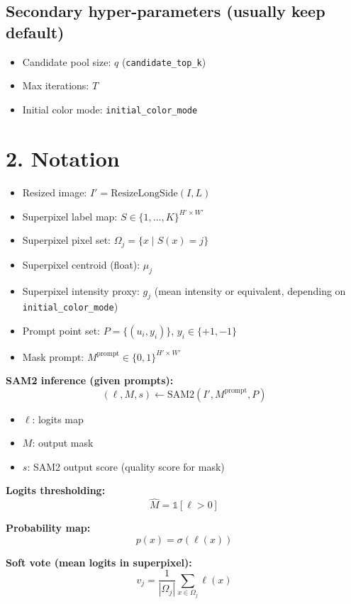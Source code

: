 \documentclass[11pt]{article}
\begin{document}
\subsection*{Secondary hyper-parameters (usually keep default)}
\begin{itemize}[leftmargin=1.25em]
  \item Candidate pool size: $q$ (\texttt{candidate\_top\_k})
  \item Max iterations: $T$
  \item Initial color mode: \texttt{initial\_color\_mode}
\end{itemize}

\section*{2. Notation}
\begin{itemize}[leftmargin=1.25em]
  \item Resized image: $I' = \mathrm{ResizeLongSide}(I, L)$
  \item Superpixel label map: $S \in \{1,\dots,K\}^{H'\times W'}$
  \item Superpixel pixel set: $\Omega_j = \{x \mid S(x)=j\}$
  \item Superpixel centroid (float): $\mu_j$
  \item Superpixel intensity proxy: $g_j$ (mean intensity or equivalent, depending on \texttt{initial\_color\_mode})
  \item Prompt point set: $P = \{(u_i, y_i)\}$, $y_i \in \{+1,-1\}$
  \item Mask prompt: $M^{\text{prompt}} \in \{0,1\}^{H'\times W'}$
\end{itemize}

\textbf{SAM2 inference (given prompts):}
\[ (\ell, M, s) \leftarrow \mathrm{SAM2}(I', M^{\text{prompt}}, P) \]
\begin{itemize}[leftmargin=1.25em]
  \item $\ell$: logits map
  \item $M$: output mask
  \item $s$: SAM2 output score (quality score for mask)
\end{itemize}

\textbf{Logits thresholding:}
\[ \hat{M} = \mathbb{1}[\ell > 0] \]

\textbf{Probability map:}
\[ p(x) = \sigma(\ell(x)) \]

\textbf{Soft vote (mean logits in superpixel):}
\[ v_j = \frac{1}{|\Omega_j|}\sum_{x\in\Omega_j} \ell(x) \]
\end{document}
